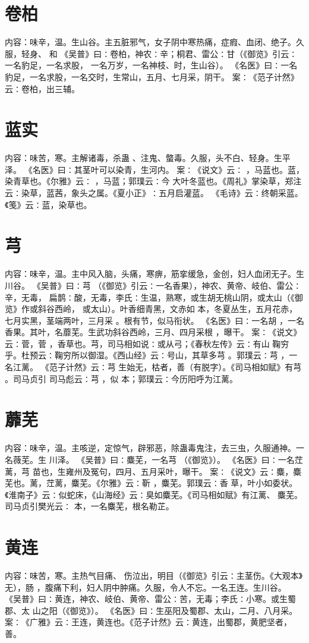 \documentclass[12pt,UTF8]{ctexbook}
\begin{document}
\section{卷柏}
内容：味辛，温。生山谷。主五脏邪气，女子阴中寒热痛，症瘕、血闭、绝子。久服，轻身、 
和 
《吴普》曰∶卷柏，神农∶辛；桐君、雷公∶甘（《御览》引云∶一名豹足，一名求股， 
一名万岁，一名神枝、时，生山谷）。 
《名医》曰∶一名豹足，一名求股，一名交时，生常山，五月、七月采，阴干。 
案∶《范子计然》云∶卷柏，出三辅。 


\section{蓝实}
内容：味苦，寒。主解诸毒，杀蛊 、注鬼、螫毒。久服，头不白、轻身。生平泽。 
《名医》曰∶其茎叶可以染青，生河内。 
案∶《说文》云∶ ，马蓝也。蓝，染青草也。《尔雅》云∶ ，马蓝；郭璞云∶今 
大叶冬蓝也。《周礼》掌染草，郑注云∶染草，蓝茜，象头之属。《夏小正》∶五月启灌蓝。 
《毛诗》云∶终朝采蓝。《笺》云∶蓝，染草也。 


\section{芎}
内容：味辛，温。主中风入脑，头痛，寒痹，筋挛缓急，金创，妇人血闭无子。生川谷。 
《吴普》曰∶芎 （《御览》引云∶一名香果），神农、黄帝、岐伯、雷公∶辛，无毒， 
扁鹊∶酸，无毒，李氏∶生温，熟寒，或生胡无桃山阴，或太山（《御览》作或斜谷西岭， 
或太山）。叶香细青黑，文赤如 本，冬夏丛生，五月花赤，七月实黑，茎端两叶，三月采 
。根有节，似马衔状。 
《名医》曰∶一名胡 ，一名香果。其叶，名蘼芜。生武功斜谷西岭，三月、四月采根 
，曝干。 
案∶《说文》云∶菅，菅 ，香草也。芎，司马相如说∶或从弓；《春秋左传》云∶有山 
鞠穷 
乎。杜预云∶鞠穷所以御湿。《西山经》云∶号山，其草多芎 。郭璞云∶芎 ，一名江蓠。 
《范子计然》云∶芎 生始无，枯者，善（有脱字）。《司马相如赋》有芎 。司马贞引 
司马彪云∶芎 ，似 本；郭璞云∶今历阳呼为江蓠。 


\section{蘼芜}
内容：味辛，温。主咳逆，定惊气，辟邪恶，除蛊毒鬼注，去三虫，久服通神。一名薇芜。生 
川泽。 
《吴普》曰∶麋芜，一名芎 （《御览》）。 
《名医》曰∶一名茳蓠，芎 苗也，生雍州及冤句，四月、五月采叶，曝干。 
案∶《说文》云∶麋，麋芜也。蓠，茳蓠，麋芜。《尔雅》云∶靳 ，麋芜。郭璞云∶香 
草，叶小如委状。《淮南子》云∶似蛇床，《山海经》云∶臭如麋芜。《司马相如赋》有江蓠、 
麋芜。司马贞引樊光云∶ 本，一名麋芜，根名勒芷。 


\section{黄连}
内容：味苦，寒。主热气目痛、 伤泣出，明目（《御览》引云∶主茎伤。《大观本》无），肠 
，腹痛下利，妇人阴中肿痛。久服，令人不忘。一名王连。生川谷。 
《吴普》曰∶黄连，神农、岐伯、黄帝、雷公∶苦，无毒；李氏∶小寒。或生蜀郡、太 
山之阳（《御览》）。 
《名医》曰∶生巫阳及蜀郡、太山，二月、八月采。 
案∶《广雅》云∶王连，黄连也。《范子计然》云∶黄连，出蜀郡，黄肥坚者，善。 
\end{document}
